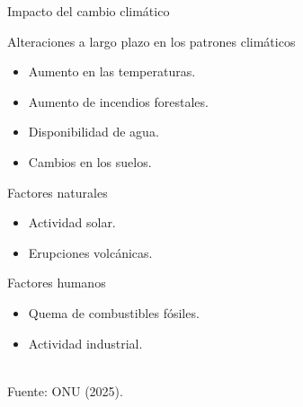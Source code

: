 \documentclass[aspectratio=169]{beamer}
\begin{document}
\begin{frame}{Impacto del cambio climático}
    \vspace{-1.5cm}
    \begin{block}{\centering Alteraciones a largo plazo en los patrones climáticos}
       \begin{minipage}{0.5\textwidth}
			\pause\begin{itemize}
				\item Aumento en las temperaturas.
                \item Aumento de incendios forestales.
			\end{itemize}
		\end{minipage}%
		\pause\begin{minipage}{0.5\textwidth}
			\begin{itemize}
				\item Disponibilidad de agua.
                \item Cambios en los suelos.
			\end{itemize}
		\end{minipage}
    \end{block}

    \begin{minipage}{0.5\textwidth}
			\pause\begin{block}{Factores naturales}
				\begin{itemize}
					\item Actividad solar.
					\item Erupciones volcánicas.
				\end{itemize}
			\end{block}
		\end{minipage}%
		\begin{minipage}{0.5\textwidth}
			\pause\vspace{0cm}\begin{block}{Factores humanos}
				\begin{itemize}
					\item Quema de combustibles fósiles.
					\item Actividad industrial. \phantom{p}
				\end{itemize}
			\end{block}
		\end{minipage}
        \,\\
    \hfill \scriptsize Fuente: ONU (2025).
\end{frame}
\end{document}
